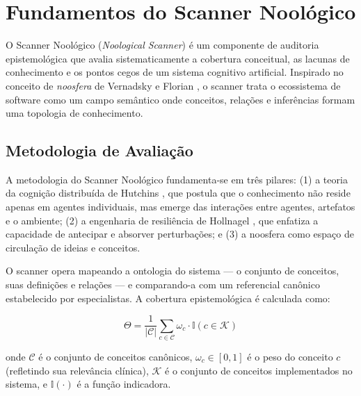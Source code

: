 
\section{Fundamentos do Scanner Noológico}

O Scanner Noológico (\textit{Noological Scanner}) é um componente de auditoria epistemológica que avalia sistematicamente a cobertura conceitual, as lacunas de conhecimento e os pontos cegos de um sistema cognitivo artificial. Inspirado no conceito de \textit{noosfera} de Vernadsky e Florian \cite{florian2005noosphere}, o scanner trata o ecossistema de software como um campo semântico onde conceitos, relações e inferências formam uma topologia de conhecimento.

\subsection{Metodologia de Avaliação}

A metodologia do Scanner Noológico fundamenta-se em três pilares: (1) a teoria da cognição distribuída de Hutchins \cite{hutchins1995cognition}, que postula que o conhecimento não reside apenas em agentes individuais, mas emerge das interações entre agentes, artefatos e o ambiente; (2) a engenharia de resiliência de Hollnagel \cite{hollnagel2018cognitive}, que enfatiza a capacidade de antecipar e absorver perturbações; e (3) a noosfera como espaço de circulação de ideias e conceitos.

O scanner opera mapeando a ontologia do sistema --- o conjunto de conceitos, suas definições e relações --- e comparando-a com um referencial canônico estabelecido por especialistas. A cobertura epistemológica é calculada como:

\begin{equation}
\Theta = \frac{1}{|\mathcal{C}|} \sum_{c \in \mathcal{C}} \omega_c \cdot \mathbb{I}(c \in \mathcal{K})
\label{eq:coverage_index}
\end{equation}

onde $\mathcal{C}$ é o conjunto de conceitos canônicos, $\omega_c \in [0,1]$ é o peso do conceito $c$ (refletindo sua relevância clínica), $\mathcal{K}$ é o conjunto de conceitos implementados no sistema, e $\mathbb{I}(\cdot)$ é a função indicadora.

